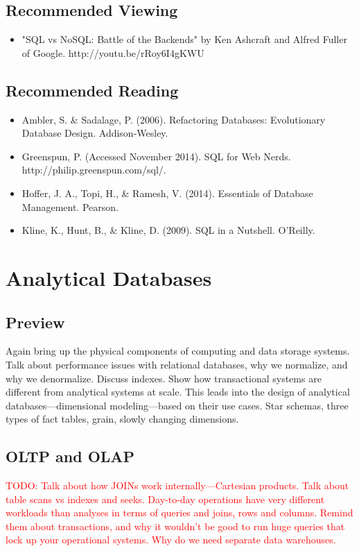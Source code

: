 \documentclass[11pt]{book}
\newcommand{\todo}[1]{\textcolor{red}{TODO: #1}} %
\begin{document}
\section*{Recommended Viewing}
\begin{itemize}
    \item "SQL vs NoSQL: Battle of the Backends" by Ken Ashcraft and Alfred Fuller of Google.  http://youtu.be/rRoy6I4gKWU
\end{itemize}

\section*{Recommended Reading}
\begin{itemize}
    \item Ambler, S. \& Sadalage, P. (2006). Refactoring Databases: Evolutionary Database Design.  Addison-Wesley.
    \item Greenspun, P.  (Accessed November 2014). SQL for Web Nerds.\\ http://philip.greenspun.com/sql/.
    \item Hoffer, J. A., Topi, H., \& Ramesh, V. (2014). Essentials of Database Management.  Pearson.
    \item Kline, K., Hunt, B., \& Kline, D. (2009).  SQL in a Nutshell.  O'Reilly.
\end{itemize}









\chapter{Analytical Databases}\label{ch:olap}

\section*{Preview}

Again bring up the physical components of computing and data storage systems.  Talk about performance issues with relational databases, why we normalize, and why we denormalize.  Discuss indexes.  Show how transactional systems are different from analytical systems at scale.  This leads into the design of analytical databases---dimensional modeling---based on their use cases.  Star schemas, three types of fact tables, grain, slowly changing dimensions.

\section{OLTP and OLAP}
\todo{Talk about how JOINs work internally---Cartesian products.  Talk about table scans vs indexes and seeks.  Day-to-day operations have very different workloads than analyses in terms of queries and joins, rows and columns.  Remind them about transactions, and why it wouldn't be good to run huge queries that lock up your operational systems.  Why do we need separate data warehouses.}
\end{document}
